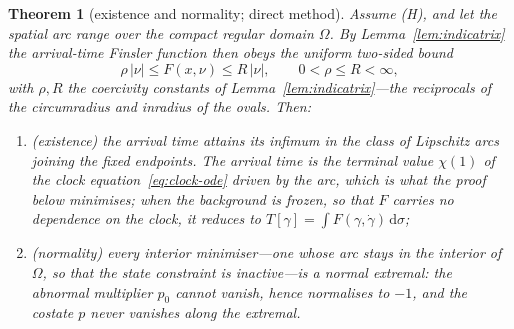 \documentclass[12pt]{iopart}
\newcommand{\dd}{\mathrm{d}}
\theoremstyle{plain}
\newtheorem{theorem}{Theorem}
\theoremstyle{definition}
\theoremstyle{plain}
\theoremstyle{remark}
\newcommand{\Ithm}[1]{\setcounter{theorem}{\numexpr#1-1\relax}}
\begin{document}
\Ithm{2}
\begin{theorem}[existence and normality; direct method]\label{thm:existence}
Assume (H), and let the spatial arc range over the compact regular domain $\Omega$. By
Lemma~\ref{lem:indicatrix} the arrival-time Finsler function then obeys the uniform
two-sided bound
\begin{equation}
  \rho\,|\nu| \le F(x,\nu) \le R\,|\nu|, \qquad 0<\rho\le R<\infty,
  \label{eq:coercive}
\end{equation}
with $\rho,R$ the coercivity constants of Lemma~\ref{lem:indicatrix}---the
reciprocals of the circumradius and inradius of the ovals. Then:
\begin{enumerate}
\item[(i)] \emph{(existence)} the arrival time attains its infimum in the class of
Lipschitz arcs joining the fixed endpoints. The arrival time is the terminal value
$\chi(1)$ of the clock equation~\eqref{eq:clock-ode} driven by the arc, which is what
the proof below minimises; when the background is frozen, so that $F$ carries no
dependence on the clock, it reduces to
$T[\gamma]=\int F(\gamma,\dot\gamma)\,\dd\sigma$;
\item[(ii)] \emph{(normality)} every \emph{interior} minimiser---one whose arc stays in
the interior of $\Omega$, so that the state constraint is inactive---is a \emph{normal}
extremal: the abnormal multiplier $p_0$ cannot vanish, hence normalises to $-1$, and the
costate $p$ never vanishes along the extremal.
\end{enumerate}
\end{theorem}
\end{document}
